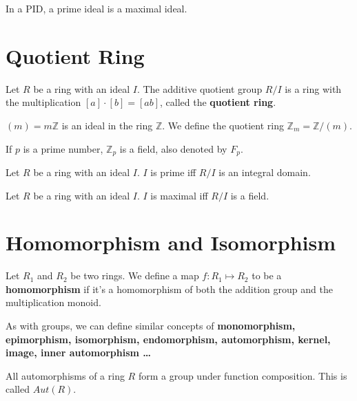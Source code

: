 \documentclass[12pt]{book}
\begin{document}
\begin{lemma}
	In a PID, a prime ideal is a maximal ideal.
\end{lemma}

\section{Quotient Ring}

\begin{definition}
	Let $R$ be a ring with an ideal $I$. The additive quotient group $R/I$ is a ring with the multiplication $[a]\cdot [b]=[ab]$, called the {\bf quotient ring}.
\end{definition}

\begin{example}
	$(m)=m\mathbb Z$ is an ideal in the ring $\mathbb Z$. We define the quotient ring $\mathbb Z_m=\mathbb Z/(m)$.
\end{example}

\begin{lemma}
	If $p$ is a prime number, $\mathbb Z_p$ is a field, also denoted by $F_p$.
\end{lemma}

\begin{lemma}
	Let $R$ be a ring with an ideal $I$. $I$ is prime iff $R/I$ is an integral domain.
\end{lemma}

\begin{lemma}
	Let $R$ be a ring with an ideal $I$. $I$ is maximal iff $R/I$ is a field.
\end{lemma}

	
\section{Homomorphism and Isomorphism}
\begin{definition}
	Let $R_1$ and $R_2$ be two rings. We define a map $f:R_1\mapsto R_2$ to be a {\bf homomorphism} if it's a homomorphism of both the addition group and the multiplication monoid.
\end{definition}

As with groups, we can define similar concepts of {\bf monomorphism, epimorphism, isomorphism, endomorphism, automorphism, kernel, image, inner automorphism \dots}
	
\begin{lemma}
	All automorphisms of a ring $R$ form a group under function composition. This is called $Aut(R)$.
\end{lemma}	
\end{document}
